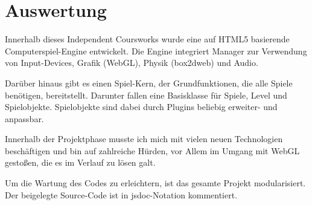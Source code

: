 \chapter*{Auswertung}

Innerhalb dieses Independent Coursworks wurde eine auf HTML5 basierende Computerspiel-Engine entwickelt. Die Engine integriert Manager zur Verwendung von Input-Devices, Grafik (WebGL), Physik (box2dweb) und Audio.

Darüber hinaus gibt es einen Spiel-Kern, der Grundfunktionen, die alle Spiele benötigen, bereitstellt. Darunter fallen eine Basisklasse für Spiele, Level und Spielobjekte. Spielobjekte sind dabei durch Plugins beliebig erweiter- und anpassbar.

Innerhalb der Projektphase musste ich mich mit vielen neuen Technologien beschäftigen und bin auf zahlreiche Hürden, vor Allem im Umgang mit WebGL gestoßen, die es im Verlauf zu lösen galt.

Um die Wartung des Codes zu erleichtern, ist das gesamte Projekt modularisiert. Der beigelegte Source-Code ist in jsdoc-Notation kommentiert.
